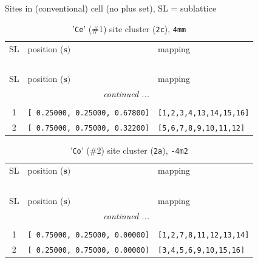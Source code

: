 \documentclass[fleqn,10pt,landscape]{jsarticle}
\begin{document}
\noindent Sites in (conventional) cell (no plus set), SL = sublattice

\renewcommand{\arraystretch}{1.6}
\begin{longtable}[l]{cll}
\captionsetup{justification=raggedright, singlelinecheck=off}
\caption{'\texttt{Ce}' (\#1) site cluster (\texttt{2c}), \texttt{4mm}}
 \\
 \hline \hline
SL & position ($\bm{s})$ & mapping \\ \hline \endfirsthead

\multicolumn{2}{l}{\tablename\ \thetable{}} \\
 \hline \hline
SL & position ($\bm{s})$ & mapping \\ \hline \endhead

 \hline \hline
\multicolumn{2}{r}{\footnotesize\it continued ...} \\ \endfoot

 \hline \hline
\multicolumn{2}{r}{} \\ \endlastfoot

1 & \texttt{[ 0.25000, 0.25000, 0.67800]} & \texttt{[1,2,3,4,13,14,15,16]} \\ \hline
2 & \texttt{[ 0.75000, 0.75000, 0.32200]} & \texttt{[5,6,7,8,9,10,11,12]} \\
\end{longtable}
\renewcommand{\arraystretch}{1.6}
\begin{longtable}[l]{cll}
\captionsetup{justification=raggedright, singlelinecheck=off}
\caption{'\texttt{Co}' (\#2) site cluster (\texttt{2a}), \texttt{-4m2}}
 \\
 \hline \hline
SL & position ($\bm{s})$ & mapping \\ \hline \endfirsthead

\multicolumn{2}{l}{\tablename\ \thetable{}} \\
 \hline \hline
SL & position ($\bm{s})$ & mapping \\ \hline \endhead

 \hline \hline
\multicolumn{2}{r}{\footnotesize\it continued ...} \\ \endfoot

 \hline \hline
\multicolumn{2}{r}{} \\ \endlastfoot

1 & \texttt{[ 0.75000, 0.25000, 0.00000]} & \texttt{[1,2,7,8,11,12,13,14]} \\ \hline
2 & \texttt{[ 0.25000, 0.75000, 0.00000]} & \texttt{[3,4,5,6,9,10,15,16]} \\
\end{longtable}
\end{document}
